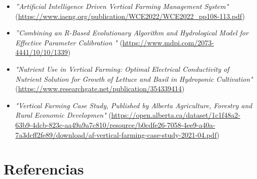\documentclass[10pt]{article}
\begin{document}
\begin{itemize}
    \item \textit{''Artificial Intelligence Driven Vertical Farming Management System"} (\url{https://www.iaeng.org/publication/WCE2022/WCE2022_pp108-113.pdf})
     \item \textit{''Combining an R-Based Evolutionary Algorithm and Hydrological Model for Effective Parameter Calibration "} (\url{https://www.mdpi.com/2073-4441/10/10/1339})
     \item \textit{"Nutrient Use in Vertical Farming: Optimal Electrical Conductivity of Nutrient Solution for Growth of Lettuce and Basil in Hydroponic Cultivation"} (\url{https://www.researchgate.net/publication/354339414})
     \item \textit{"Vertical Farming Case Study, Published by Alberta Agriculture, Forestry and Rural Economic Developmen"} (\url{https://open.alberta.ca/dataset/1c1f48a2-63b9-4dcb-823c-aa49a9a7c810/resource/b0cdfe26-7058-4ee9-a40a-7a3dcff2fe89/download/af-vertical-farming-case-study-2021-04.pdf})
\end{itemize}



\newpage
\section*{Referencias}
  \nocite{*}
  \printbibliography[heading=none]
\end{document}
